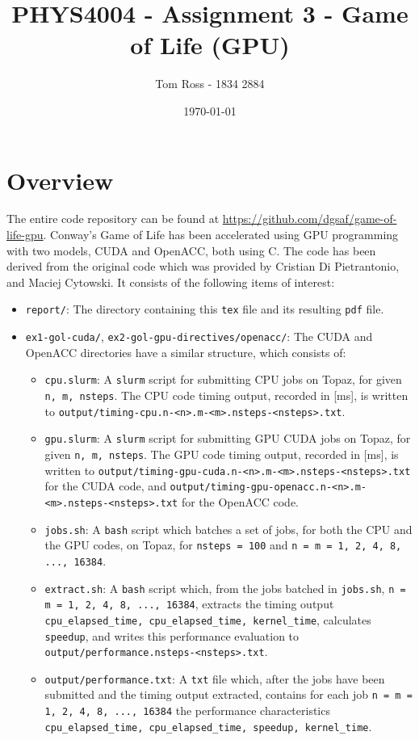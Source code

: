 \documentclass{article}
\title{PHYS4004 - Assignment 3 - Game of Life (GPU)}
\author{Tom Ross - 1834 2884}
\date{\today}
\newcommand{\lilf}[1]{\lstinline[style=ff]{#1}}
\begin{document}
\tableofcontents

\listoffigures

\listoftables

\clearpage
\section{Overview}
\label{sec:overview}

The entire code repository can be found at
\url{https://github.com/dgsaf/game-of-life-gpu}.
Conway's Game of Life has been accelerated using GPU programming with two
models, CUDA and OpenACC, both using C.
The code has been derived from the original code which was provided by Cristian
Di Pietrantonio, and Maciej Cytowski.
It consists of the following items of interest:
\begin{itemize}
\item \lilf{report/}:
  The directory containing this \lilf{tex} file and its resulting \lilf{pdf}
  file.

\item \lilf{ex1-gol-cuda/}, \lilf{ex2-gol-gpu-directives/openacc/}:
  The CUDA and OpenACC directories have a similar structure, which consists of:

  \begin{itemize}
  \item \lilf{cpu.slurm}:
    A \lilf{slurm} script for submitting CPU jobs on Topaz, for given
    \lstinline{n, m, nsteps}.
    The CPU code timing output, recorded in [\si{\milli\second}], is written to
    \lstinline{output/timing-cpu.n-<n>.m-<m>.nsteps-<nsteps>.txt}.

  \item \lilf{gpu.slurm}:
    A \lilf{slurm} script for submitting GPU CUDA jobs on Topaz, for given
    \lstinline{n, m, nsteps}.
    The GPU code timing output, recorded in [\si{\milli\second}], is written to
    \lilf{output/timing-gpu-cuda.n-<n>.m-<m>.nsteps-<nsteps>.txt} for the CUDA
    code, and \lilf{output/timing-gpu-openacc.n-<n>.m-<m>.nsteps-<nsteps>.txt}
    for the OpenACC code.

  \item \lilf{jobs.sh}:
    A \lilf{bash} script which batches a set of jobs, for both
    the CPU and the GPU codes, on Topaz, for \lstinline{nsteps = 100} and
    \lstinline{n = m = 1, 2, 4, 8, ..., 16384}.

  \item \lilf{extract.sh}:
    A \lilf{bash} script which, from the jobs batched in \lilf{jobs.sh},
    \lstinline{n = m = 1, 2, 4, 8, ..., 16384}, extracts the timing output
    \lstinline{cpu_elapsed_time, cpu_elapsed_time, kernel_time}, calculates
    \lstinline{speedup}, and writes this performance evaluation to
    \lilf{output/performance.nsteps-<nsteps>.txt}.

  \item \lilf{output/performance.txt}:
    A \lilf{txt} file which, after the jobs have been submitted and the timing
    output extracted, contains for each job
    \lstinline{n = m = 1, 2, 4, 8, ..., 16384} the performance characteristics
    \lstinline{cpu_elapsed_time, cpu_elapsed_time, speedup, kernel_time}.
  \end{itemize}
\end{itemize}
\end{document}
